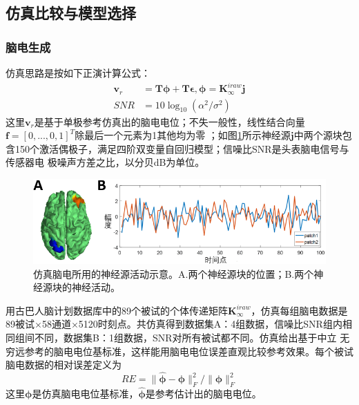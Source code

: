 \subsection{仿真比较与模型选择}
\subsubsection{脑电生成}
仿真思路是按如下正演计算公式：
\begin{equation}\label{eq3.18}
\begin{aligned}
\mathbf{v}_r& =\mathbf{T\phi}+\mathbf{T\epsilon},\mathbf{\phi}=\mathbf{K}_{\infty}^{iraw}\mathbf{j}\\
SNR& =10\log_{10}(\alpha^2/\sigma^2)
\end{aligned}
\end{equation}
这里$\mathbf{v}_r$是基于单极参考仿真出的脑电电位；不失一般性，线性结合向量$\mathbf{f}=[0,...,0,1]^T$除最后一个元素为1其他均为零
；如图\ref{3:3}所示神经源$\mathbf{j}$中两个源块包含150个激活偶极子，满足四阶双变量自回归模型；信噪比SNR是头表脑电信号与传感器电
极噪声方差之比，以分贝dB为单位。
\begin{figure}[!h]
	\centering
	\includegraphics[width=15cm]{pic/Frontier/figure3.png}
	\caption{仿真脑电所用的神经源活动示意。A.两个神经源块的位置；B.两个神经源块的神经活动。}
	\label{3:3}
\end{figure}
用古巴人脑计划数据库中的89个被试的个体传递矩阵$\mathbf{K}_{\infty}^{iraw}$，仿真每组脑电数据是89被试$\times$58通道$\times$5120时刻点。共仿真得到数据集A：4组数据，信噪比SNR组内相同组间不同，数据集B：1组数据，SNR对所有被试都不同。仿真给出基于中立
无穷远参考的脑电电位基标准，这样能用脑电电位误差直观比较参考效果。每个被试脑电数据的相对误差定义为
\begin{equation}\label{eq3.19}
RE=\lVert\hat{\mathbf{\phi}}-\mathbf{\phi}\rVert^2_F/{\lVert\mathbf{\phi}\rVert^2_F}
\end{equation}
这里$\mathbf{\phi}$是仿真脑电电位基标准，$\hat{\mathbf{\phi}}$是参考估计出的脑电电位。

